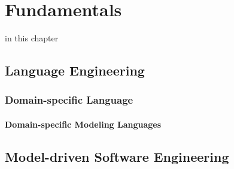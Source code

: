 \chapter{Fundamentals}
\label{ch:fundamentals}

in this chapter

\section{Language Engineering}
\subsection{Domain-specific Language}
\subsubsection{Domain-specific Modeling Languages}
\section{Model-driven Software Engineering}